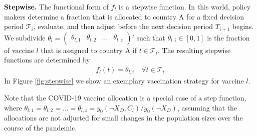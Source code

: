 \textbf{Stepwise.} The functional form of $f_{l}$ is a stepwise function. In this world, policy makers determine a fraction that is allocated to country A for a fixed decision period $\mathcal{T}_i$, evaluate, and then adjust before the next decision period $T_{i+1}$ begins. 
We subdivide $\theta_l = \begin{pmatrix}
\theta_{l,1}  & \theta_{l,2} & \dots & \theta_{l,z} \end{pmatrix}'$ such that $\theta_{l,i} \in [0,1]$ is the fraction of vaccine $l$ that is assigned to country A if $t \in \mathcal{T}_i$. The resulting stepwise functions are determined by
\begin{align*}
f_l(t) = \theta_{l,i} \quad \forall t \in \mathcal{T}_i
\end{align*}
In Figure \ref{fig:stepwise} we show an exemplary vaccination strategy for vaccine $l$.

Note that the COVID-19 vaccine allocation is a special case of a step function, where $\theta_{l;1}= \theta_{l,2} = \hdots = \theta_{l,z}=y_0(\neg X_D, C_l)/y_0(\neg X_D)$, assuming that the allocations are not adjusted for small changes in the population sizes over the course of the pandemic.\\

